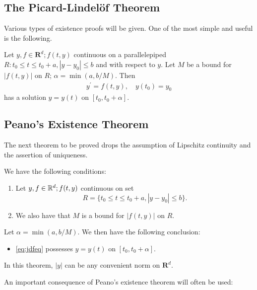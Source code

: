 \documentclass{article}
\begin{document}
\subsection{The Picard-Lindel\"of Theorem}
Various types of existence proofs will be given. One of the most simple and useful is the following.
\begin{thma}\label{thm:djhfads}
Let $y, f \in \mathbf{R}^{d} ; f(t, y)$ continuous on a parallelepiped $R: t_{0} \le t \le t_{0}+a,\left|y-y_{0}\right| \le b$ and  with respect to $y$. Let $M$ be a bound for $|f(t, y)|$ on $R$; $\alpha=\min (a, b / M)$. Then
\begin{align}
    y^{\prime}=f(t, y), \quad y\left(t_{0}\right)=y_{0}\label{eq:jdfeq}
\end{align}
has a  solution $y=y(t)$ on $\left[t_{0}, t_{0}+\alpha\right]$.
\end{thma}
\subsection{Peano's Existence Theorem}
The next theorem to be proved drops the assumption of Lipschitz continuity and the assertion of uniqueness.
\begin{thma} \label{thm:Peano}We have the following conditions:
\begin{enumerate}
    \item  Let $y, f \in \mathbb{R}^{d} ; f(t, y)$ continuous on set $$R=\{ t_{0} \le t \le t_{0}+a, \left|y-y_{0}\right| \le b \}.$$ 
    \item We also have that $M$ is a bound for $|f(t, y)|$ on $R$.
\end{enumerate}

  Let $\alpha=\min (a, b / M)$. 
 We then  have the following conclusion:
 \begin{itemize}
     \item \cref{eq:jdfeq} possesses  $y=y(t)$ on $\left[t_{0}, t_{0}+\alpha\right]$.
 \end{itemize}
 
\end{thma}
\begin{rema}
In this theorem, $|y|$ can be any convenient norm on $\mathbf{R}^{d}$.
\end{rema}
An important consequence of Peano's existence theorem will often be used:
\end{document}
